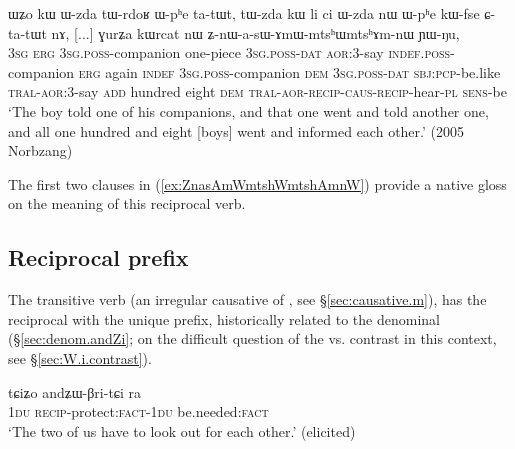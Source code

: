 \begin{exe}
\ex \label{ex:ZnasAmWmtshWmtshAmnW}
\gll ɯʑo kɯ ɯ-zda tɯ-rdoʁ ɯ-pʰe ta-tɯt, tɯ-zda kɯ li ci ɯ-zda nɯ ɯ-pʰe kɯ-fse ɕ-ta-tɯt nɤ,
[...] ɣurʑa kɯrcat nɯ ʑ-nɯ-a-sɯ-ɤmɯ-mtsʰɯ\redp{}mtsʰɤm-nɯ ɲɯ-ŋu, \\
\textsc{3sg} \textsc{erg} \textsc{3sg}.\textsc{poss}-companion one-piece \textsc{3sg}.\textsc{poss}-\textsc{dat} \textsc{aor}:3\flobv{}-say \textsc{indef}.\textsc{poss}-companion \textsc{erg} again \textsc{indef} \textsc{3sg}.\textsc{poss}-companion \textsc{dem} \textsc{3sg}.\textsc{poss}-\textsc{dat}  \textsc{sbj}:\textsc{pcp}-be.like \textsc{tral}-\textsc{aor}:3\flobv{}-say \textsc{add} { } hundred eight \textsc{dem} \textsc{tral}-\textsc{aor}-\textsc{recip}-\textsc{caus}-\textsc{recip}-hear-\textsc{pl} \textsc{sens}-be \\
\glt `The boy told one of his companions, and that one went and told another one, and all one hundred and eight [boys] went and informed each other.' (2005 Norbzang)
\end{exe}

The first two clauses in (\ref{ex:ZnasAmWmtshWmtshAmnW}) provide a native gloss on the meaning of this reciprocal verb.


 \subsection{Reciprocal  prefix} \label{sec:andZW.reciprocal}
The transitive verb  (an irregular causative of  , see §\ref{sec:causative.m}), has the reciprocal  with the unique  prefix, historically related to the denominal  (§\ref{sec:denom.andZi}; on the difficult question of the  vs.  contrast in this context, see §\ref{sec:W.i.contrast}).

\begin{exe}
\ex \label{ex:andWBritCi}
\gll tɕiʑo andʑɯ-βri-tɕi ra \\
\textsc{1du} \textsc{recip}-protect:\textsc{fact}-\textsc{1du} be.needed:\textsc{fact} \\
\glt `The two of us have to look out for each other.' (elicited)
\end{exe}

